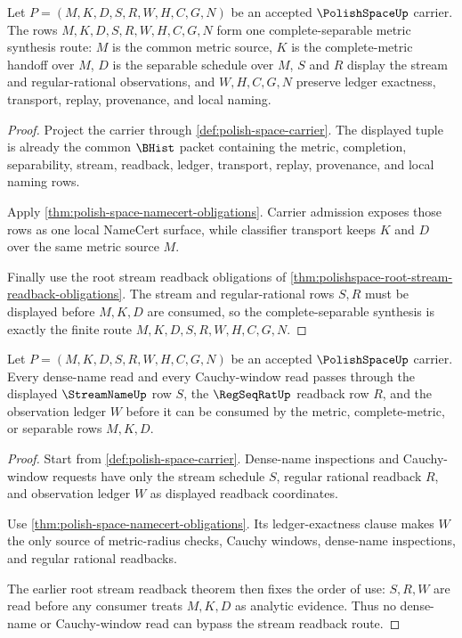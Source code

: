 \begin{theorem}
\label{thm:polishspace-complete-separable-root-synthesis}
Let $P=(M,K,D,S,R,W,H,C,G,N)$ be an accepted $\PolishSpaceUp$ carrier. The
rows $M,K,D,S,R,W,H,C,G,N$ form one complete-separable metric synthesis route:
$M$ is the common metric source, $K$ is the complete-metric handoff over $M$,
$D$ is the separable schedule over $M$, $S$ and $R$ display the stream and
regular-rational observations, and $W,H,C,G,N$ preserve ledger exactness,
transport, replay, provenance, and local naming.
\end{theorem}
\begin{proof}
Project the carrier through \autoref{def:polish-space-carrier}. The displayed
tuple is already the common $\BHist$ packet containing the metric, completion,
separability, stream, readback, ledger, transport, replay, provenance, and
local naming rows.

Apply \autoref{thm:polish-space-namecert-obligations}. Carrier admission
exposes those rows as one local NameCert surface, while classifier transport
keeps $K$ and $D$ over the same metric source $M$.

Finally use the root stream readback obligations of
\autoref{thm:polishspace-root-stream-readback-obligations}. The stream and
regular-rational rows $S,R$ must be displayed before $M,K,D$ are consumed, so
the complete-separable synthesis is exactly the finite route
$M,K,D,S,R,W,H,C,G,N$.
\end{proof}

\begin{theorem}
\label{thm:polishspace-stream-readback-exactness}
Let $P=(M,K,D,S,R,W,H,C,G,N)$ be an accepted $\PolishSpaceUp$ carrier. Every
dense-name read and every Cauchy-window read passes through the displayed
$\StreamNameUp$ row $S$, the $\RegSeqRatUp$ readback row $R$, and the
observation ledger $W$ before it can be consumed by the metric,
complete-metric, or separable rows $M,K,D$.
\end{theorem}
\begin{proof}
Start from \autoref{def:polish-space-carrier}. Dense-name inspections and
Cauchy-window requests have only the stream schedule $S$, regular rational
readback $R$, and observation ledger $W$ as displayed readback coordinates.

Use \autoref{thm:polish-space-namecert-obligations}. Its ledger-exactness
clause makes $W$ the only source of metric-radius checks, Cauchy windows,
dense-name inspections, and regular rational readbacks.

The earlier root stream readback theorem then fixes the order of use: $S,R,W$
are read before any consumer treats $M,K,D$ as analytic evidence. Thus no
dense-name or Cauchy-window read can bypass the stream readback route.
\end{proof}

